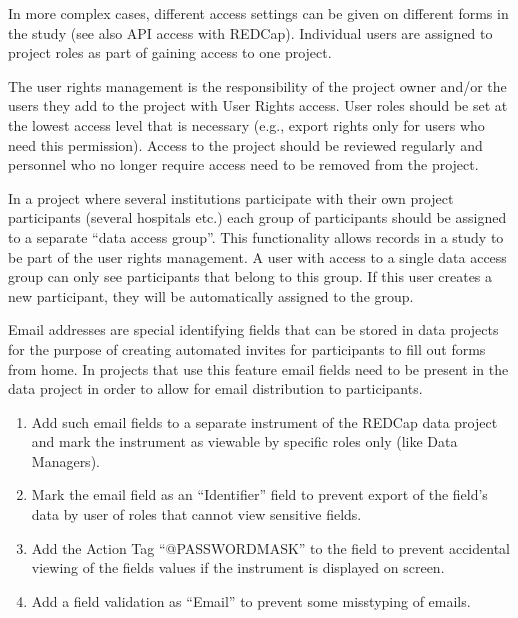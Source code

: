 \documentclass[letterpaper,10pt,english]{sphinxmanual}
\begin{document}
\sphinxAtStartPar
In more complex cases, different access settings can be given on different forms in the study (see also API access with REDCap). Individual users are assigned to project roles as part of gaining access to one project.

\sphinxAtStartPar
The user rights management is the responsibility of the project owner and/or the users they add to the project with User Rights access. User roles should be set at the lowest access level that is necessary (e.g., export rights only for users who need this permission). Access to the project should be reviewed regularly and personnel who no longer require access need to be removed from the project.

\sphinxAtStartPar
{}

\sphinxAtStartPar
In a project where several institutions participate with their own project participants (several hospitals etc.) each group of participants should be assigned to a separate “data access group”. This functionality allows records in a study to be part of the user rights management. A user with access to a single data access group can only see participants that belong to this group. If this user creates a new participant, they will be automatically assigned to the group.

\sphinxAtStartPar
{}

\sphinxAtStartPar
Email addresses are special identifying fields that can be stored in data projects for the purpose of creating automated invites for participants to fill out forms from home. In projects that use this feature email fields need to be present in the data project in order to allow for email distribution to participants.
\begin{enumerate}
%
\item {} 
\sphinxAtStartPar
Add such email fields to a separate instrument of the REDCap data project and mark the instrument as viewable by specific roles only (like Data Managers).

\item {} 
\sphinxAtStartPar
Mark the email field as an “Identifier” field to prevent export of the field’s data by user  of roles that cannot view sensitive fields.

\item {} 
\sphinxAtStartPar
Add the Action Tag “@PASSWORDMASK” to the field to prevent accidental viewing of the fields values if the instrument is displayed on screen.

\item {} 
\sphinxAtStartPar
Add a field validation as “Email” to prevent some miss\sphinxhyphen{}typing of emails.

\end{enumerate}
\end{document}
